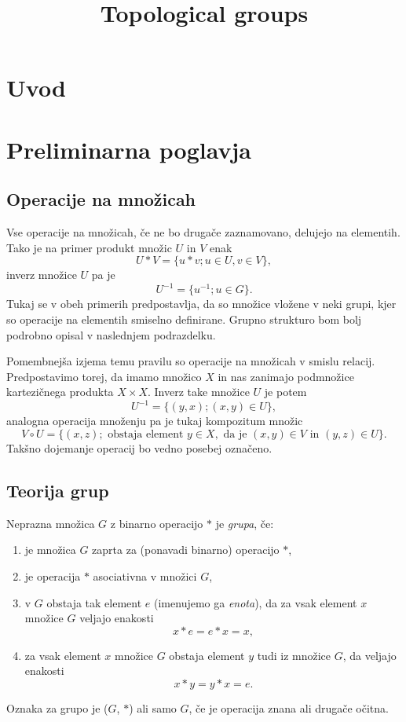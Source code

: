 \documentclass[mat1]{fmfdelo}
\title{Topological groups}
\begin{document}
\section{Uvod}

\section{Preliminarna poglavja}

\subsection{Operacije na množicah}\label{sec:opnamnozicah}
Vse operacije na množicah, če ne bo drugače zaznamovano, delujejo na elementih. Tako je na primer produkt množic $U$ in $V$ enak \[U * V = \lbrace u * v ; u \in U, v \in V \rbrace, \] inverz množice $U$ pa je \[ U^{-1} = \lbrace u^{-1} ; u \in G \rbrace. \] Tukaj se v obeh primerih predpostavlja, da so množice vložene v neki grupi, kjer so operacije na elementih smiselno definirane. Grupno strukturo bom bolj podrobno opisal v naslednjem podrazdelku.

Pomembnejša izjema temu pravilu so operacije na množicah v smislu relacij. Predpostavimo torej, da imamo množico $X$ in nas zanimajo podmnožice kartezičnega produkta $X \times X$. Inverz take množice $U$ je potem \[ U^{-1} = \lbrace (y, x) ; (x, y) \in U \rbrace, \]
analogna operacija množenju pa je tukaj kompozitum množic \[ V \circ U = \lbrace (x, z) ; \text{ obstaja element } y \in X, \text{ da je } (x, y) \in V \text{ in } (y, z) \in U \rbrace. \]
Takšno dojemanje operacij bo vedno posebej označeno.

\subsection{Teorija grup}
\begin{definicija}\label{def:grupa}
Neprazna množica $G$ z binarno operacijo $*$ je \emph{grupa}, če:
\begin{enumerate}
\item je množica $G$ zaprta za (ponavadi binarno) operacijo $*$,
\item je operacija $*$ asociativna v množici $G$,
\item v $G$ obstaja tak element $e$ (imenujemo ga \emph{enota}), da za vsak element $x$ množice $G$ veljajo enakosti \[ x*e = e*x = x, \]
\item za vsak element $x$ množice $G$ obstaja element $y$ tudi iz množice $G$, da veljajo enakosti \[ x*y = y*x = e. \]
\end{enumerate}
Oznaka za grupo je ($G$, $*$) ali samo $G$, če je operacija znana ali drugače očitna.
\end{definicija}
\end{document}
